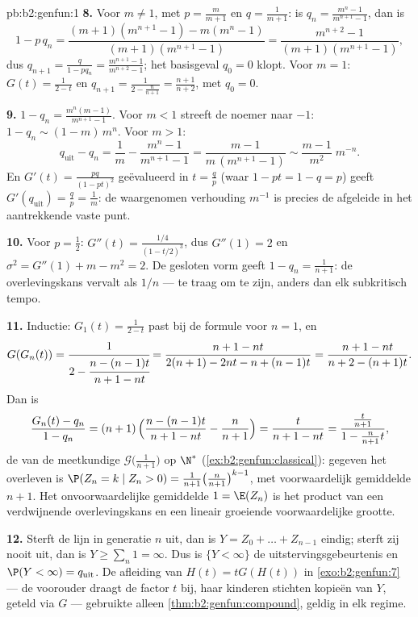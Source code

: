 \begin{solution}{pb:b2:genfun:1}
\textbf{8.} Voor $m \neq 1$, met $p = \frac m{m+1}$ en $q =
\frac1{m+1}$: is $q_n = \frac{m^n - 1}{m^{n+1} - 1}$, dan is
\[
1 - p\,q_n = \frac{(m+1)(m^{n+1} - 1) - m(m^n - 1)}
{(m+1)(m^{n+1} - 1)} = \frac{m^{n+2} - 1}{(m+1)(m^{n+1} -
1)},
\]
dus $q_{n+1} = \frac{q}{1 - pq_n} = \frac{m^{n+1} - 1}{m^{n+2} -
1}$; het basisgeval $q_0 = 0$ klopt. Voor $m = 1$: $G(t) =
\frac1{2 - t}$ en $q_{n+1} = \frac1{2 - \frac{n}{n+1}} =
\frac{n+1}{n+2}$, met $q_0 = 0$.

\textbf{9.} $1 - q_n = \frac{m^n(m - 1)}{m^{n+1} - 1}$. Voor $m <
1$ streeft de noemer naar $-1$: $1 - q_n \sim (1 - m)\,m^n$. Voor
$m > 1$:
\[
q_{\mathrm{uit}} - q_n = \frac1m - \frac{m^n - 1}{m^{n+1} -
1} = \frac{m - 1}{m\,(m^{n+1} - 1)} \sim \frac{m -
1}{m^{2}}\;m^{-n} .
\]
En $G'(t) = \frac{pq}{(1 - pt)^2}$ geëvalueerd in $t = \frac qp$
(waar $1 - pt = 1 - q = p$) geeft $G'(q_{\mathrm{uit}}) = \frac qp
= \frac1m$: de waargenomen verhouding $m^{-1}$ is precies de
afgeleide in het aantrekkende vaste punt.

\textbf{10.} Voor $p = \frac12$: $G''(t) = \frac{1/4}{(1 -
t/2)^3}$, dus $G''(1) = 2$ en $\sigma^2 = G''(1) + m - m^2 = 2$. De
gesloten vorm geeft $1 - q_n = \frac1{n+1}$: de overlevingskans
vervalt als $1/n$ --- te traag om  te zijn, anders dan
elk subkritisch tempo.

\textbf{11.} Inductie: $G_1(t) = \frac1{2-t}$ past bij de formule
voor $n = 1$, en
\[
G(G_n(t)) = \cfrac{1}{2 - \cfrac{n - (n-1)t}{n+1 - nt}}
= \frac{n + 1 - nt}{2(n+1) - 2nt - n + (n-1)t}
= \frac{n+1 - nt}{n + 2 - (n+1)t} .
\]
Dan is
\[
\frac{G_n(t) - q_n}{1 - q_n}
= (n+1)\,\Bigl(\frac{n - (n-1)t}{n+1 - nt} -
\frac{n}{n+1}\Bigr)
= \frac{t}{n + 1 - nt}
= \frac{\frac{t}{n+1}}{1 - \frac{n}{n+1}t} ,
\]
de  van de meetkundige  $\mathcal
G\bigl(\frac1{n+1} \bigr)$ op $\N^*$
(\cref{ex:b2:genfun:classical}): gegeven het overleven is $\P(Z_n =
k \mid Z_n > 0) = \frac1{n+1}\bigl(\frac n{n+1}\bigr)^{k-1}$, met
voorwaardelijk gemiddelde $n + 1$. Het onvoorwaardelijke gemiddelde
$1 = \E(Z_n)$ is het product van een verdwijnende overlevingskans
en een lineair groeiende voorwaardelijke grootte.

\textbf{12.} Sterft de lijn in generatie $n$ uit, dan is $Y = Z_0 +
\dots + Z_{n-1}$ eindig; sterft zij nooit uit, dan is $Y \geq
\sum_n 1 = \infty$. Dus is $\{Y < \infty\}$ de
uitstervingsgebeurtenis en $\P(Y < \infty) = q_{\mathrm{uit}}$. De
afleiding van $H(t) = tG(H(t))$ in \cref{exo:b2:genfun:7} --- de
voorouder draagt de factor $t$ bij, haar kinderen stichten
 kopieën van $Y$, geteld via $G$ --- gebruikte alleen
\cref{thm:b2:genfun:compound}, geldig in elk regime.


\end{solution}
